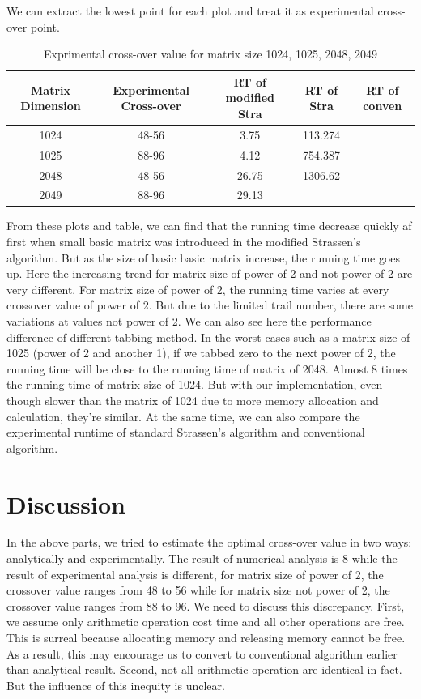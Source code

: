 \documentclass[a4paper, 11pt]{article}
\begin{document}
We can extract the lowest point for each plot and treat it as experimental cross-over point.
\begin{table}[h]
	\centering
	\caption{Exprimental cross-over value for matrix size 1024, 1025, 2048, 2049}
	\begin{tabular}{|c|c|c|c|c|}
		\hline 
		Matrix Dimension& Experimental Cross-over&RT of modified Stra& RT of Stra&RT of conven \\ 
		\hline 
		1024& 48-56& 3.75&113.274&\\ 
		\hline 
		1025& 88-96& 4.12&754.387&\\ 
		\hline 
		2048& 48-56& 26.75&1306.62&\\ 
		\hline 
		2049& 88-96& 29.13&&\\ 
		\hline 
	\end{tabular} 
\end{table}
From these plots and table, we can find that the running time decrease quickly af first when small basic matrix was introduced in the modified Strassen's algorithm. But as the size of basic basic matrix increase, the running time goes up. Here the increasing trend for matrix size of power of 2 and not power of 2 are very different. For matrix size of power of 2, the running time varies at every crossover value of power of 2. But due to the limited trail number, there are some variations at values not power of 2. We can also see here the performance difference of different tabbing method. In the worst cases such as a matrix size of 1025 (power of 2 and another 1), if we tabbed zero to the next power of 2, the running time will be close to the running time of matrix of 2048. Almost 8 times the running time of matrix size of 1024. But with our implementation, even though slower than the matrix of 1024 due to more memory allocation and calculation, they're similar. At the same time, we can also compare the experimental runtime of standard Strassen's algorithm and conventional algorithm.

\section*{Discussion}
In the above parts, we tried to estimate the optimal cross-over value in two ways: analytically and experimentally. The result of numerical analysis is 8 while the result of experimental analysis is different, for matrix size of power of 2, the crossover value ranges from 48 to 56 while for matrix size not power of 2, the crossover value ranges from 88 to 96. We need to discuss this discrepancy. First, we assume only arithmetic operation cost time and all other operations are free. This is surreal because allocating memory and releasing memory cannot be free. As a result, this may encourage us to convert to conventional algorithm earlier than analytical result. Second, not all arithmetic operation are identical in fact. But the influence of this inequity is unclear.
\end{document}
